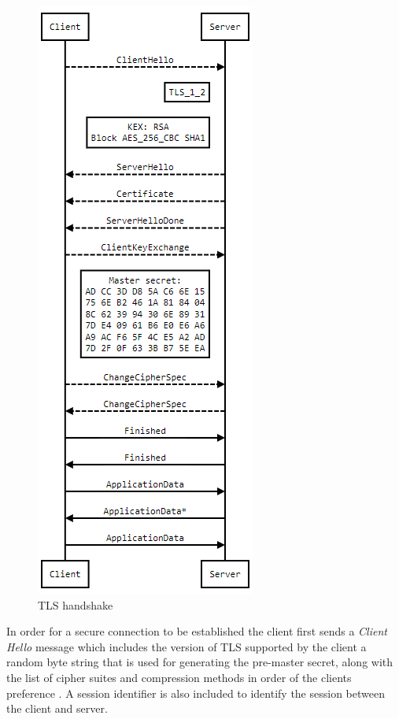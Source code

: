 \documentclass[a4wide,leqno,12pt]{report}
\begin{document}
 \begin{figure}[H]
\centering
\includegraphics[scale=.6]{images/tls_demo.png}
\caption{TLS handshake}
\end{figure}
In order for a secure connection to be established the client first sends a \textit{Client Hello} message which includes the version of TLS supported by the client a random byte string that is used for generating the pre-master secret, along with the list of cipher suites and compression methods in order of the clients preference \cite{tlsDemoServer}. A session identifier is also included to identify the session between the client and server\cite{turner2014transport}.
\end{document}
